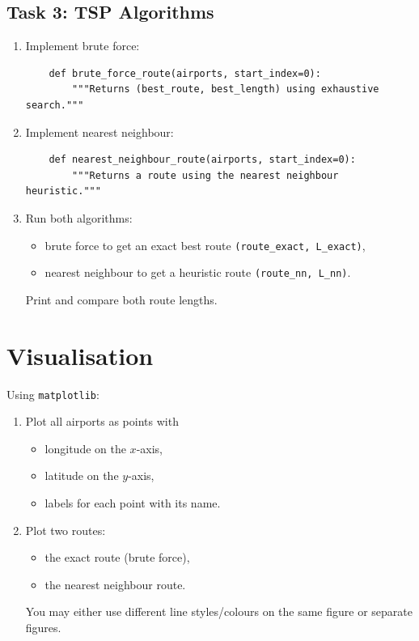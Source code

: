 \documentclass[11pt]{article}
\begin{document}
\subsection*{Task 3: TSP Algorithms}
\begin{enumerate}
    \item Implement brute force:
    \begin{verbatim}
    def brute_force_route(airports, start_index=0):
        """Returns (best_route, best_length) using exhaustive search."""
    \end{verbatim}
    \item Implement nearest neighbour:
    \begin{verbatim}
    def nearest_neighbour_route(airports, start_index=0):
        """Returns a route using the nearest neighbour heuristic."""
    \end{verbatim}
    \item Run both algorithms:
    \begin{itemize}
        \item brute force to get an exact best route \texttt{(route\_exact, L\_exact)},
        \item nearest neighbour to get a heuristic route \texttt{(route\_nn, L\_nn)}.
    \end{itemize}
    Print and compare both route lengths.
\end{enumerate}

\section{Visualisation}
Using \texttt{matplotlib}:
\begin{enumerate}
    \item Plot all airports as points with
    \begin{itemize}
        \item longitude on the $x$-axis,
        \item latitude on the $y$-axis,
        \item labels for each point with its name.
    \end{itemize}

\item Plot two routes:
\begin{itemize}
    \item the exact route (brute force),
    \item the nearest neighbour route.
\end{itemize}
    You may either use different line styles/colours on the same figure or separate figures.
\end{enumerate}
\end{document}
